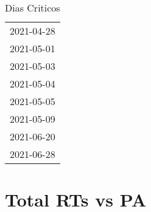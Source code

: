 \documentclass[
]{article}
\author{}
\date{\vspace{-2.5em}}
\begin{document}
\begin{table}[H]
    \centering
    \caption{Dias Criticos}
    \label{tab:dias_criticos}
    \begin{tabular}{c}
        \toprule
          2021-04-28 \\
          2021-05-01 \\
          2021-05-03 \\
          2021-05-04 \\
          2021-05-05 \\
          2021-05-09 \\
          2021-06-20 \\
          2021-06-28 \\
        \bottomrule
    \end{tabular}
\end{table}

\tableofcontents
\newpage
\section{Total RTs vs PA}
\end{document}
